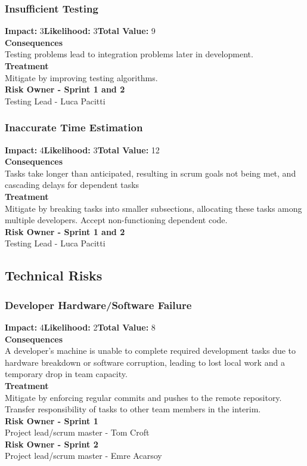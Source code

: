 \documentclass[11pt]{article}
\begin{document}
\subsubsection{Insufficient Testing}
\textbf{Impact:} 3\quad \textbf{Likelihood:} 3\quad \textbf{Total Value:} 9\\
\textbf{Consequences}\\
Testing problems lead to integration problems later in development.\\
\textbf{Treatment}\\
Mitigate by improving testing algorithms.\\
\textbf{Risk Owner - Sprint 1 and 2}\\
Testing Lead - Luca Pacitti
\subsubsection{Inaccurate Time Estimation}
\textbf{Impact:} 4\quad \textbf{Likelihood:} 3\quad \textbf{Total Value:} 12\\
\textbf{Consequences}\\
Tasks take longer than anticipated, resulting in scrum goals not being met, and cascading delays for dependent tasks\\
\textbf{Treatment}\\
Mitigate by breaking tasks into smaller subsections, allocating these tasks among multiple developers. Accept non-functioning dependent code.\\
\textbf{Risk Owner - Sprint 1 and 2}\\
Testing Lead - Luca Pacitti
\subsection{Technical Risks}
\subsubsection{Developer Hardware/Software Failure}
\textbf{Impact:} 4\quad \textbf{Likelihood:} 2\quad \textbf{Total Value:} 8\\
\textbf{Consequences}\\
A developer's machine is unable to complete required development tasks due to hardware breakdown or software corruption, leading to lost local work and a temporary drop in team capacity.\\
\textbf{Treatment}\\
Mitigate by enforcing regular commits and pushes to the remote repository. Transfer responsibility of tasks to other team members in the interim.\\
\textbf{Risk Owner - Sprint 1}\\
Project lead/scrum master - Tom Croft\\
\textbf{Risk Owner - Sprint 2}\\
Project lead/scrum master - Emre Acarsoy
\end{document}
